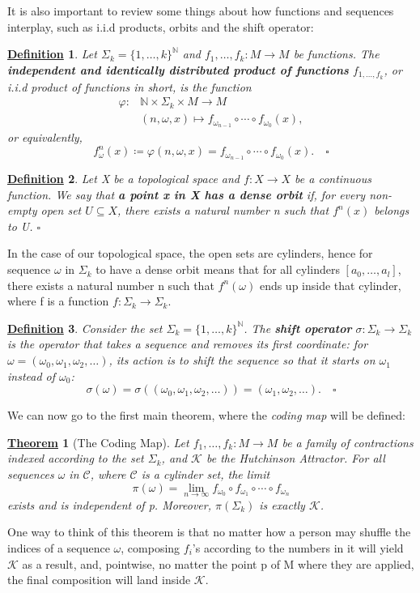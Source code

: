 \documentclass{article}
\newtheorem*{def*}{\underline{Definition}}
\newtheorem*{theorem*}{\underline{Theorem}}
\begin{document}
It is also important to review some things about how functions and sequences interplay, such as i.i.d products, orbits and the shift operator:
\begin{def*}
	Let \(\Sigma_{k}=\{1,\dotsc ,k\}^{\mathbb{N}}\) and \(f_{1},\dotsc , f_{k}:M\rightarrow M\) be functions. The \textbf{independent and identically distributed product of functions }\(f_{1,\dotsc , f_{k}}\), or
	i.i.d product of functions in short, is the function
	\begin{align*}
		\varphi: & \mathbb{N}\times \Sigma_{k}\times M\rightarrow M                          \\
		         & (n, \omega, x)\mapsto f_{\omega_{n-1}}\circ\cdots\circ f_{\omega_{0}}(x),
	\end{align*}
	or equivalently,
	\[
		f_{\omega }^{n}(x)\coloneqq \varphi(n, \omega, x)=f_{\omega_{n-1}}\circ\cdots\circ f_{\omega_{0}}(x). \quad \square
	\]
\end{def*}
\begin{def*}
	Let X be a topological space and \(f:X\rightarrow X\) be a continuous function. We say that \textbf{a point x in X has a dense orbit} if, for every non-empty open set \(U\subseteq X\), there exists a natural number
	n such that \(f^{n}(x)\) belongs to U. \(\square\)
\end{def*}
In the case of our topological space, the open sets are cylinders, hence for sequence \(\omega\) in \(\Sigma_{k}\) to have a dense orbit means that for all cylinders \([a_{0},\dotsc ,a_{l}]\), there exists a natural number
n such that \(f^{n}(\omega)\) ends up inside that cylinder, where f is a function \(f:\Sigma_{k}\rightarrow \Sigma_{k}\).
\begin{def*}
	Consider the set \(\Sigma_{k}=\{1,\dotsc ,k\}^{\mathbb{N}}\). The \textbf{shift operator} \(\sigma:\Sigma_{k}\rightarrow \Sigma_{k}\) is the operator that takes a sequence and removes its first coordinate: for
	\(\omega = (\omega_{0}, \omega_{1}, \omega_{2}, \dotsc ) \), its action is to shift the sequence so that it starts on \(\omega_{1}\) instead of \(\omega_{0}\):
	\[
		\sigma(\omega)=\sigma((\omega_{0}, \omega_{1}, \omega_{2}, \dotsc ))=(\omega_{1}, \omega_{2}, \dotsc ).\quad \square
	\]
\end{def*}

We can now go to the first main theorem, where the \textit{coding map} will be defined:
\begin{theorem*}[The Coding Map]
	Let \(f_{1},\dotsc , f_{k}:M\rightarrow M\) be a family of contractions indexed according to the set \(\Sigma_{k}\), and \(\mathcal{K}\) be the Hutchinson Attractor. For all sequences
	\(\omega  \) in \(\mathcal{C}\), where \(\mathcal{C}\) is a cylinder set, the limit
	\[
		\pi(\omega )=\lim_{n\to \infty} f_{\omega_{0}}\circ f_{\omega_{1}}\circ\cdots\circ f_{\omega_{n}}
	\]
	exists and is independent of p. Moreover, \(\pi(\Sigma_{k})\) is exactly \(\mathcal{K}\).
\end{theorem*}
One way to think of this theorem is that no matter how a person may shuffle the indices of a sequence \(\omega \), composing \(f_{i}\)'s according to the numbers in it
will yield \(\mathcal{K}\) as a result, and, pointwise, no matter the point p of M where they are applied, the final composition will land inside \(\mathcal{K}\).
\end{document}
